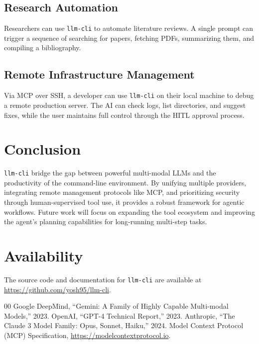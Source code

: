\documentclass[conference]{IEEEtran}
\begin{document}
\subsection{Research Automation}
Researchers can use \texttt{llm-cli} to automate literature reviews. A single prompt can trigger a sequence of searching for papers, fetching PDFs, summarizing them, and compiling a bibliography.

\subsection{Remote Infrastructure Management}
Via MCP over SSH, a developer can use \texttt{llm-cli} on their local machine to debug a remote production server. The AI can check logs, list directories, and suggest fixes, while the user maintains full control through the HITL approval process.

\section{Conclusion}
\texttt{llm-cli} bridge the gap between powerful multi-modal LLMs and the productivity of the command-line environment. By unifying multiple providers, integrating remote management protocols like MCP, and prioritizing security through human-supervised tool use, it provides a robust framework for agentic workflows. Future work will focus on expanding the tool ecosystem and improving the agent's planning capabilities for long-running multi-step tasks.

\section*{Availability}
The source code and documentation for \texttt{llm-cli} are available at \url{https://github.com/yosh95/llm-cli}.

\begin{thebibliography}{00}
 Google DeepMind, ``Gemini: A Family of Highly Capable Multi-modal Models,'' 2023.
 OpenAI, ``GPT-4 Technical Report,'' 2023.
 Anthropic, ``The Claude 3 Model Family: Opus, Sonnet, Haiku,'' 2024.
 Model Context Protocol (MCP) Specification, \url{https://modelcontextprotocol.io}.
\end{thebibliography}
\end{document}
